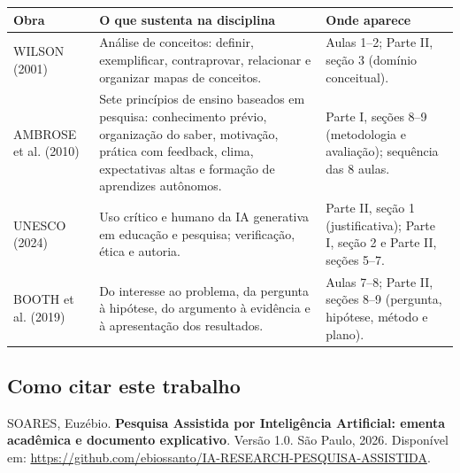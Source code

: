 \documentclass[11pt,a4paper]{article}
\begin{document}
{\small
\begin{tabular}{|p{}|p{}|p{}|}
\hline
\textbf{Obra} & \textbf{O que sustenta na disciplina} & \textbf{Onde aparece} \\
\hline
WILSON (2001) & Análise de conceitos: definir, exemplificar, contraprovar, relacionar e organizar mapas de conceitos. & Aulas 1--2; Parte II, seção 3 (domínio conceitual). \\
\hline
AMBROSE et al. (2010) & Sete princípios de ensino baseados em pesquisa: conhecimento prévio, organização do saber, motivação, prática com feedback, clima, expectativas altas e formação de aprendizes autônomos. & Parte I, seções 8--9 (metodologia e avaliação); sequência das 8 aulas. \\
\hline
UNESCO (2024) & Uso crítico e humano da IA generativa em educação e pesquisa; verificação, ética e autoria. & Parte II, seção 1 (justificativa); Parte I, seção 2 e Parte II, seções 5--7. \\
\hline
BOOTH et al. (2019) & Do interesse ao problema, da pergunta à hipótese, do argumento à evidência e à apresentação dos resultados. & Aulas 7--8; Parte II, seções 8--9 (pergunta, hipótese, método e plano). \\
\hline
\end{tabular}
}

\subsection*{Como citar este trabalho}

{\small
SOARES, Euzébio. \textbf{Pesquisa Assistida por Inteligência Artificial: ementa acadêmica e
documento explicativo}. Versão 1.0. São Paulo, 2026. Disponível em:
\url{https://github.com/ebiossanto/IA-RESEARCH-PESQUISA-ASSISTIDA}.
}
\end{document}
